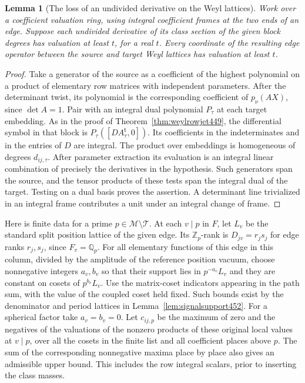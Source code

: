 \documentclass[a4paper,11pt]{article}
\newtheorem{lemma}[proposition]{Lemma}
\theoremstyle{definition}
\theoremstyle{remark}
\numberwithin{equation}{section}
\begin{document}
\begin{lemma}[The loss of an undivided derivative on the Weyl lattices]\leavevmode
\label{lem:jetweyl453}
Work over a coefficient valuation ring, using integral coefficient
frames at the two ends of an edge. Suppose each undivided
derivative of its class section of the given block degrees has
valuation at least \(t\), for a real \(t\). Every coordinate of
the resulting edge operator between the source and target Weyl
lattices has valuation at least \(t\).
\end{lemma}
\begin{proof}
Take a generator of the source as a coefficient of the
highest polynomial on a product of elementary row matrices
with independent parameters. After the determinant twist,
its polynomial is the corresponding coefficient of
\(p_\nu(AX)\), since \(\det A=1\).
Pair with an integral dual polynomial \(P_\tau\) at each target
embedding. As in the proof of Theorem~\ref{thm:weylrowjet449},
the differential symbol in that block is
\(P_\tau([D A_\tau^{\mathsf t},0])\). Its coefficients in
the indeterminates and in the entries of \(D\) are integral.
The product over embeddings is homogeneous of degrees
\(d_{ij,\tau}\). After parameter extraction its evaluation
is an integral linear combination of precisely the derivatives
in the hypothesis. Such generators span the source, and the
tensor products of these tests span the integral dual of the
target. Testing on a dual basis proves the assertion. A
determinant line trivialized in an integral frame contributes
a unit under an integral change of frame.
\end{proof}

Here is finite data for a prime \(p\in\mathcal M\setminus\mathcal T\).
At each \(v\mid p\) in \(F\), let \(L_v\) be the standard
split position lattice of the given edge. Its
\(\mathbb Z_p\)-rank is \(D_{jv}=r_js_j\) for edge ranks
\(r_j,s_j\), since \(F_v=\mathbb Q_p\). For all elementary
functions of this edge in this column, divided by the amplitude
of the reference position vacuum, choose nonnegative integers
\(a_v,b_v\) so that their support lies in \(p^{-a_v}L_v\)
and they are constant on cosets of \(p^{b_v}L_v\). Use the
matrix-coset indicators appearing in the path sum, with the
value of the coupled coset held fixed. Such bounds exist by
the denominator and period lattices in Lemma~\ref{lem:signalsupport452}.
For a spherical factor take \(a_v=b_v=0\). Let \(c_{ij,p}\)
be the maximum of zero and the negatives of the valuations of
the nonzero products of these original local values at \(v\mid p\),
over all the cosets in the finite list and all coefficient
places above \(p\). The sum of the corresponding nonnegative
maxima place by place also gives an admissible upper bound. This includes the row
integral scalars, prior to inserting the class masses.
\end{document}
